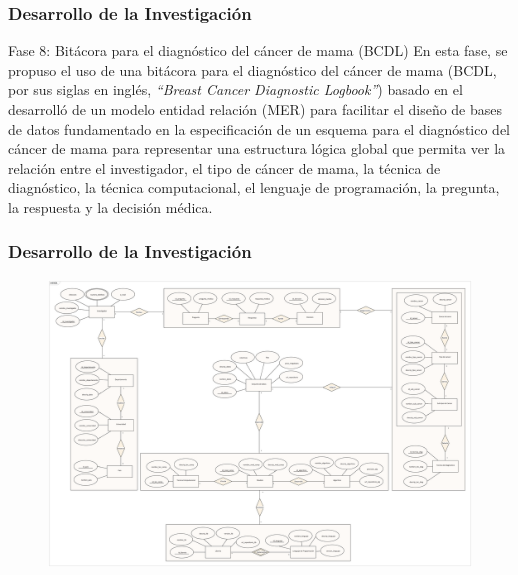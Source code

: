 \documentclass[xcolor=dvipsnames,xcolor=table,10pt]{beamer} %
\begin{document}
\begin{frame}
	\frametitle{Desarrollo de la Investigación}
	\begin{block}{Fase 8: Bitácora para el diagnóstico del cáncer de mama (BCDL)}\justifying
		En esta fase, se propuso el uso de una bitácora para el diagnóstico del cáncer de mama (BCDL, por sus siglas en inglés, \textit{“Breast Cancer Diagnostic Logbook”}) basado en el desarrolló de un modelo entidad relación (MER) para facilitar el diseño de bases de datos fundamentado en la especificación de un esquema para el diagnóstico del cáncer de mama para representar una estructura lógica global que permita ver la relación entre el investigador, el tipo de cáncer de mama, la técnica de diagnóstico, la técnica computacional, el lenguaje de programación, la pregunta, la respuesta y la decisión médica.
	\end{block}
\end{frame}

\begin{frame}
	\frametitle{Desarrollo de la Investigación}
	\begin{figure}[h!]
		\centering
		\includegraphics[width=0.9\linewidth]{IMAGENES/0_MER_BCDL}
	\end{figure}
\end{frame}	
\end{document}
